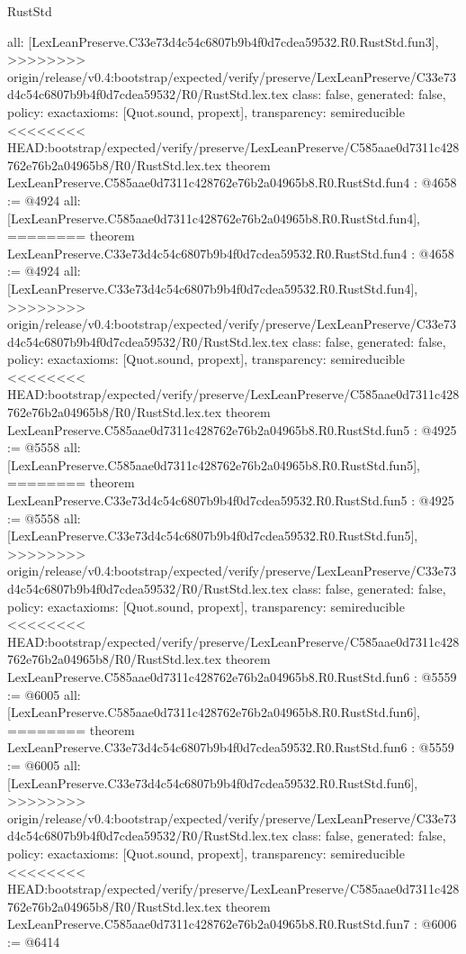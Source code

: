 \begin{lexlean}{RustStd}
\begin{coremodule}
{\begin{coremodule}
{{{{{{{  all: [LexLeanPreserve.C33e73d4c54c6807b9b4f0d7cdea59532.R0.RustStd.fun3],
>>>>>>>> origin/release/v0.4:bootstrap/expected/verify/preserve/LexLeanPreserve/C33e73d4c54c6807b9b4f0d7cdea59532/R0/RustStd.lex.tex
  class: false,
  generated: false,
  policy: exact{axioms: [Quot.sound, propext]},
  transparency: semireducible
}
<<<<<<<< HEAD:bootstrap/expected/verify/preserve/LexLeanPreserve/C585aae0d7311c428762e76b2a04965b8/R0/RustStd.lex.tex
theorem LexLeanPreserve.C585aae0d7311c428762e76b2a04965b8.R0.RustStd.fun4 : @4658 := @4924 {
  all: [LexLeanPreserve.C585aae0d7311c428762e76b2a04965b8.R0.RustStd.fun4],
========
theorem LexLeanPreserve.C33e73d4c54c6807b9b4f0d7cdea59532.R0.RustStd.fun4 : @4658 := @4924 {
  all: [LexLeanPreserve.C33e73d4c54c6807b9b4f0d7cdea59532.R0.RustStd.fun4],
>>>>>>>> origin/release/v0.4:bootstrap/expected/verify/preserve/LexLeanPreserve/C33e73d4c54c6807b9b4f0d7cdea59532/R0/RustStd.lex.tex
  class: false,
  generated: false,
  policy: exact{axioms: [Quot.sound, propext]},
  transparency: semireducible
}
<<<<<<<< HEAD:bootstrap/expected/verify/preserve/LexLeanPreserve/C585aae0d7311c428762e76b2a04965b8/R0/RustStd.lex.tex
theorem LexLeanPreserve.C585aae0d7311c428762e76b2a04965b8.R0.RustStd.fun5 : @4925 := @5558 {
  all: [LexLeanPreserve.C585aae0d7311c428762e76b2a04965b8.R0.RustStd.fun5],
========
theorem LexLeanPreserve.C33e73d4c54c6807b9b4f0d7cdea59532.R0.RustStd.fun5 : @4925 := @5558 {
  all: [LexLeanPreserve.C33e73d4c54c6807b9b4f0d7cdea59532.R0.RustStd.fun5],
>>>>>>>> origin/release/v0.4:bootstrap/expected/verify/preserve/LexLeanPreserve/C33e73d4c54c6807b9b4f0d7cdea59532/R0/RustStd.lex.tex
  class: false,
  generated: false,
  policy: exact{axioms: [Quot.sound, propext]},
  transparency: semireducible
}
<<<<<<<< HEAD:bootstrap/expected/verify/preserve/LexLeanPreserve/C585aae0d7311c428762e76b2a04965b8/R0/RustStd.lex.tex
theorem LexLeanPreserve.C585aae0d7311c428762e76b2a04965b8.R0.RustStd.fun6 : @5559 := @6005 {
  all: [LexLeanPreserve.C585aae0d7311c428762e76b2a04965b8.R0.RustStd.fun6],
========
theorem LexLeanPreserve.C33e73d4c54c6807b9b4f0d7cdea59532.R0.RustStd.fun6 : @5559 := @6005 {
  all: [LexLeanPreserve.C33e73d4c54c6807b9b4f0d7cdea59532.R0.RustStd.fun6],
>>>>>>>> origin/release/v0.4:bootstrap/expected/verify/preserve/LexLeanPreserve/C33e73d4c54c6807b9b4f0d7cdea59532/R0/RustStd.lex.tex
  class: false,
  generated: false,
  policy: exact{axioms: [Quot.sound, propext]},
  transparency: semireducible
}
<<<<<<<< HEAD:bootstrap/expected/verify/preserve/LexLeanPreserve/C585aae0d7311c428762e76b2a04965b8/R0/RustStd.lex.tex
theorem LexLeanPreserve.C585aae0d7311c428762e76b2a04965b8.R0.RustStd.fun7 : @6006 := @6414 {
}}}}}}}}}}
\end{coremodule}}
\end{coremodule}
\end{lexlean}
